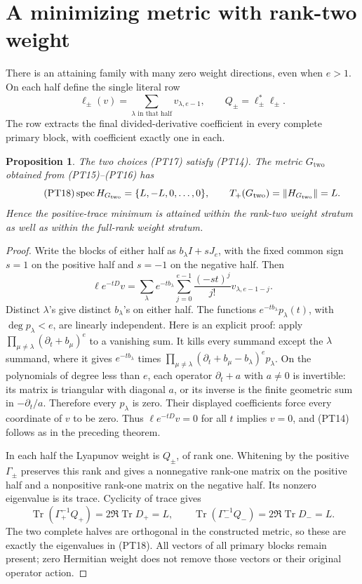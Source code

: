 \documentclass[11pt,a4paper]{article}
\newtheorem{proposition}[theorem]{Proposition}
\providecommand{\Tr}{\operatorname{Tr}}
\providecommand{\norm}[1]{\left\lVert#1\right\rVert}
\begin{document}
\section{A minimizing metric with rank-two weight}

There is an attaining family with many zero weight directions,
even when \(e>1\). On each half define the single literal row
\begin{equation}\tag{PT17}
 \ell_\pm(v)=\sum_{\lambda\text{ in that half}}v_{\lambda,e-1},
 \qquad Q_\pm=\ell_\pm^*\ell_\pm.
\end{equation}
The row extracts the final divided-derivative coefficient in every
complete primary block, with coefficient exactly one in each.

\begin{proposition}
The two choices (PT17) satisfy (PT14). The metric
\(G_{\mathrm{two}}\) obtained from (PT15)--(PT16) has
\begin{equation}\tag{PT18}
 \spec H_{G_{\mathrm{two}}}=\{L,-L,0,\ldots,0\},\qquad
 T_+(G_{\mathrm{two}})=\norm{H_{G_{\mathrm{two}}}}=L.
\end{equation}
Hence the positive-trace minimum is attained within the rank-two
weight stratum as well as within the full-rank weight stratum.
\end{proposition}
\begin{proof}
Write the blocks of either half as \(b_\lambda I+sJ_e\), with
the fixed common sign \(s=1\) on the positive half and \(s=-1\)
on the negative half. Then
\[
 \ell e^{-tD}v
 =\sum_\lambda e^{-tb_\lambda}
      \sum_{j=0}^{e-1}\frac{(-st)^j}{j!}v_{\lambda,e-1-j}.
\]
Distinct \(\lambda\)'s give distinct \(b_\lambda\)'s on
either half. The functions \(e^{-tb_\lambda}p_\lambda(t)\),
with \(\deg p_\lambda<e\), are linearly independent. Here is
an explicit proof: apply
\(\prod_{\mu\ne\lambda}(\partial_t+b_\mu)^e\) to a
vanishing sum. It kills every summand except the \(\lambda\)
summand, where it gives \(e^{-tb_\lambda}\) times
\(\prod_{\mu\ne\lambda}(\partial_t+b_\mu-b_\lambda)^e
p_\lambda\). On the polynomials of degree less than \(e\),
each operator \(\partial_t+a\) with \(a\ne0\) is invertible:
its matrix is triangular with diagonal \(a\), or its inverse
is the finite geometric sum in \(-\partial_t/a\).
Therefore every \(p_\lambda\) is zero. Their displayed
coefficients force every coordinate of \(v\) to be zero.
Thus \(\ell e^{-tD}v=0\) for all \(t\) implies \(v=0\),
and (PT14) follows as in the preceding theorem.

In each half the Lyapunov weight is \(Q_\pm\), of rank one.
Whitening by the positive \(\Gamma_\pm\) preserves this rank
and gives a nonnegative rank-one matrix on the positive half
and a nonpositive rank-one matrix on the negative half. Its
nonzero eigenvalue is its trace. Cyclicity of trace gives
\[
 \Tr(\Gamma_+^{-1}Q_+)=2\Re\Tr D_+=L,
 \qquad\Tr(\Gamma_-^{-1}Q_-)=2\Re\Tr D_-=L.
\]
The two complete halves are orthogonal in the constructed metric,
so these are exactly the eigenvalues in (PT18). All vectors of
all primary blocks remain present; zero Hermitian weight does not
remove those vectors or their original operator action.
\end{proof}
\end{document}
